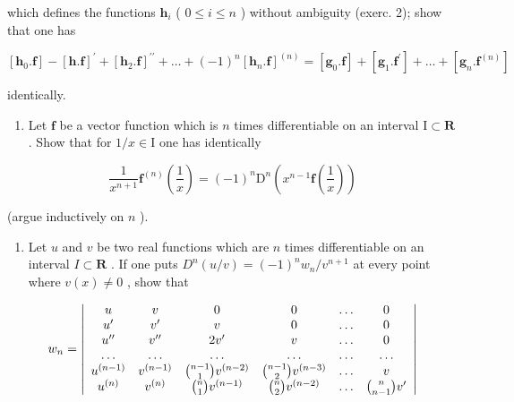 which defines the functions \(\mathbf{h}_i\) ( \(0 \leqslant i \leqslant n\) ) without ambiguity (exerc. 2); show that one has

\[
[ \mathbf {h} _ {0}. \mathbf {f} ] - [ \mathbf {h}. \mathbf {f} ] ^ {\prime} + [ \mathbf {h} _ {2}. \mathbf {f} ] ^ {\prime \prime} + \dots + (- 1) ^ {n} [ \mathbf {h} _ {n}. \mathbf {f} ] ^ {(n)} = [ \mathbf {g} _ {0}. \mathbf {f} ] + [ \mathbf {g} _ {1}. \mathbf {f} ^ {\prime} ] + \dots + [ \mathbf {g} _ {n}. \mathbf {f} ^ {(n)} ]
\]

identically.

\begin{enumerate}
\def\labelenumi{\arabic{enumi})}
\setcounter{enumi}{3}
\tightlist
\item
  Let \(\mathbf{f}\) be a vector function which is \(n\) times differentiable on an interval \(\mathrm{I} \subset \mathbf{R}\) . Show that for \(1 / x \in \mathrm{I}\) one has identically
\end{enumerate}

\[
\frac {1}{x ^ {n + 1}} \mathbf {f} ^ {(n)} \left(\frac {1}{x}\right) = (- 1) ^ {n} \mathrm{D} ^ {n} \left(x ^ {n - 1} \mathbf {f} \left(\frac {1}{x}\right)\right)
\]

(argue inductively on \(n\) ).

\begin{enumerate}
\def\labelenumi{\arabic{enumi})}
\setcounter{enumi}{4}
\tightlist
\item
  Let \(u\) and \(v\) be two real functions which are \(n\) times differentiable on an interval \(I \subset \mathbf{R}\) . If one puts \(D^n(u / v) = (-1)^n w_n / v^{n+1}\) at every point where \(v(x) \neq 0\) , show that
\end{enumerate}

\[
w _ {n} = \left| \begin{array}{c c c c c c} u & v & 0 & 0 & \dots & 0 \\ u ^ {\prime} & v ^ {\prime} & v & 0 & \dots & 0 \\ u ^ {\prime \prime} & v ^ {\prime \prime} & 2 v ^ {\prime} & v & \dots & 0 \\ \dots & \dots & \dots & \dots & \dots & \dots \\ u ^ {(n - 1)} & v ^ {(n - 1)} & \binom {n - 1} {1} v ^ {(n - 2)} & \binom {n - 1} {2} v ^ {(n - 3)} & \dots & v \\ u ^ {(n)} & v ^ {(n)} & \binom {n} {1} v ^ {(n - 1)} & \binom {n} {2} v ^ {(n - 2)} & \dots & \binom {n} {n - 1} v ^ {\prime} \end{array} \right|
\]

